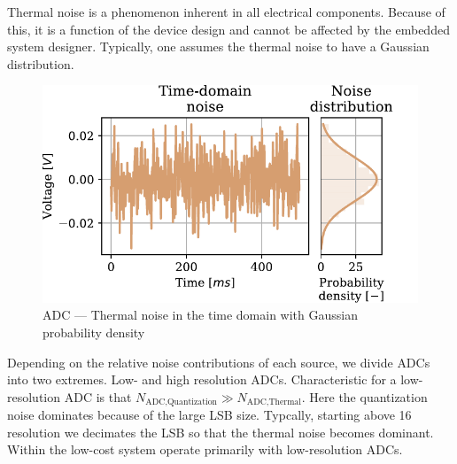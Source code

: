 Thermal noise is a phenomenon inherent in all electrical components. Because of this, it is a function of the device design and cannot be affected by the embedded system designer. Typically, one assumes the thermal noise to have a Gaussian distribution.

\begin{figure}
  \centering
  \includegraphics[scale=0.72]{figures/electronics/adc/plot_thermerr}
  \caption[ADC thermal noise]{ADC --- Thermal noise in the time domain with Gaussian probability density~\cite{hall2020fund}%
    \label{fig:plot_themerr}}
\end{figure}

Depending on the relative noise contributions of each source, we divide \ac{ADC}s into two extremes. Low- and high resolution \ac{ADC}s. Characteristic for a low-resolution \ac{ADC} is that $N_{\text{ADC},\text{Quantization}}\gg N_{\text{ADC},\text{Thermal}}$. Here the quantization noise dominates because of the large \ac{LSB} size. Typcally, starting above \SI{16}{\bit} resolution we decimates the \ac{LSB} so that the thermal noise becomes dominant. Within the low-cost system operate primarily with low-resolution \ac{ADC}s.

